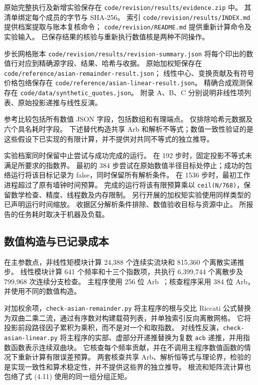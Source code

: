原始完整执行及新增实验保存在 \texttt{code/revision/results/evidence.zip} 中。
其清单绑定每个成员的字节与 SHA-256。
索引 \texttt{code/revision/results/INDEX.md} 提供档案提取与账本复核命令；
\texttt{code/revision/README.md} 提供重新计算命令及实验输入。
已保存结果的核验与重新执行数值核是两种不同操作。

步长网格账本 \texttt{code/revision/results/revision-summary.json} 将每个印出的数值行对应到精确源字段、结果、哈希与收据。
原始加权矩保存在 \texttt{code/reference/asian-remainder-result.json}；
线性中心、变换贡献及有符号价格包络保存在 \texttt{code/reference/asian-linear-result.json}。
精确合成观测保存在 \texttt{code/data/synthetic\_quotes.json}。
附录 A、B、C 分别说明非线性项列表、原始投影递推与线性反演。

参考比较包括所有数值 JSON 字段，包括数组和有理端点。
仅排除哈希元数据及六个具名耗时字段。
下述替代构造共享 Arb 和解析不等式；数值一致性验证的是这些假设下已实现的有限计算，并不提供对共同不等式的独立推导。

实验档案同时保留中止尝试与成功完成的运行。
在 192 步时，固定投影不等式未满足所要求的指数界。
最初的 384 步尝试在原始数值半径目标处停止；成功的包络运行将该目标记录为 false，同时保留所有解析条件。
在 1536 步时，最初工作进程超过了原有墙钟时间预算。
完成的运行将该有限预算乘以 \texttt{ceil(N/768)}，保留数学检查、精度、线程数及内存限制。
另行开展的加权矩实验使用同样类型的已声明运行时间缩放。
收据区分解析条件排除、数值验收目标与资源中止。
所报告的任务耗时取决于机器及负载。


\subsection{数值构造与已记录成本}


在主参数点，非线性矩模块计算 24,388 个连续实流块和 815,360 个离散实递推步。
线性模块计算 641 个频率和十三个指数项，共执行 6,399,744 个离散步及 799,968 次连续分支检查。
主程序使用 256 位 Arb~\cite{Johansson2017}；核查程序采用 384 位 Arb，并使用不同的数值构造。

对加权余项，\texttt{check-asian-remainder.py} 将主程序的根与交比 Riccati 公式替换为双曲二乘二流，通过有序数对构建载荷列表，并单独索引反向离散网格。
它将投影前段路径因子累积为乘积，而不是对一个和取指数。
对线性反演，\texttt{check-asian-linear.py} 将主程序的实部、虚部分开递推替换为复数 \texttt{acb} 递推，并用指数函数表示连续双曲块。
它核查每个频率贡献，并在不调用主程序数值函数的情况下重新计算有限误差预算。
两套核查共享 Arb、解析恒等式与理论界，检验的是实现一致性和算术稳定性，并不提供这些界的独立推导。
根流和矩阵流计算也包络了式 (4.11) 使用的同一组分组正矩。

